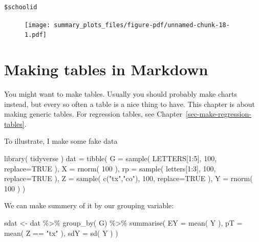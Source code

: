\documentclass[
  letterpaper,
  DIV=11,
  numbers=noendperiod]{scrreprt}
\newenvironment{Shaded}{\begin{snugshade}}{\end{snugshade}}
\newcommand{\AttributeTok}[1]{\textcolor[rgb]{0.49,0.56,0.16}{#1}}
\newcommand{\ConstantTok}[1]{\textcolor[rgb]{0.53,0.00,0.00}{#1}}
\newcommand{\DecValTok}[1]{\textcolor[rgb]{0.25,0.63,0.44}{#1}}
\newcommand{\FunctionTok}[1]{\textcolor[rgb]{0.02,0.16,0.49}{#1}}
\newcommand{\NormalTok}[1]{\textcolor[rgb]{0.00,0.44,0.13}{#1}}
\newcommand{\OtherTok}[1]{\textcolor[rgb]{0.00,0.44,0.13}{#1}}
\newcommand{\SpecialCharTok}[1]{\textcolor[rgb]{0.25,0.44,0.63}{#1}}
\newcommand{\StringTok}[1]{\textcolor[rgb]{0.25,0.44,0.63}{#1}}
\begin{document}
\begin{verbatim}
$schoolid
\end{verbatim}

\begin{figure}[H]

{\centering \texttt{[image: summary\_plots\_files/figure-pdf/unnamed-chunk-18-1.pdf]}

}

\end{figure}

\hypertarget{sec-make-tables}{%
\chapter{Making tables in Markdown}\label{sec-make-tables}}

You might want to make tables. Usually you should probably make charts
instead, but every so often a table is a nice thing to have. This
chapter is about making generic tables. For regression tables, see
Chapter~\ref{sec-make-regression-tables}.

To illustrate, I make some fake data

\begin{Shaded}
\begin{Highlighting}[]
\FunctionTok{library}\NormalTok{( tidyverse )}
\NormalTok{dat }\OtherTok{=} \FunctionTok{tibble}\NormalTok{( }\AttributeTok{G =} \FunctionTok{sample}\NormalTok{( LETTERS[}\DecValTok{1}\SpecialCharTok{:}\DecValTok{5}\NormalTok{], }\DecValTok{100}\NormalTok{, }\AttributeTok{replace=}\ConstantTok{TRUE}\NormalTok{ ),}
              \AttributeTok{X =} \FunctionTok{rnorm}\NormalTok{( }\DecValTok{100}\NormalTok{ ),}
              \AttributeTok{rp =} \FunctionTok{sample}\NormalTok{( letters[}\DecValTok{1}\SpecialCharTok{:}\DecValTok{3}\NormalTok{], }\DecValTok{100}\NormalTok{, }\AttributeTok{replace=}\ConstantTok{TRUE}\NormalTok{ ),}
              \AttributeTok{Z =} \FunctionTok{sample}\NormalTok{( }\FunctionTok{c}\NormalTok{(}\StringTok{"tx"}\NormalTok{,}\StringTok{"co"}\NormalTok{), }\DecValTok{100}\NormalTok{, }\AttributeTok{replace=}\ConstantTok{TRUE}\NormalTok{ ),}
              \AttributeTok{Y =} \FunctionTok{rnorm}\NormalTok{( }\DecValTok{100}\NormalTok{ ) )}
\end{Highlighting}
\end{Shaded}

We can make summery of it by our grouping variable:

\begin{Shaded}
\begin{Highlighting}[]
\NormalTok{sdat }\OtherTok{\textless{}{-}}\NormalTok{ dat }\SpecialCharTok{\%\textgreater{}\%} \FunctionTok{group\_by}\NormalTok{( G) }\SpecialCharTok{\%\textgreater{}\%}
    \FunctionTok{summarise}\NormalTok{( }\AttributeTok{EY =} \FunctionTok{mean}\NormalTok{( Y ),}
               \AttributeTok{pT =} \FunctionTok{mean}\NormalTok{( Z }\SpecialCharTok{==} \StringTok{"tx"}\NormalTok{ ),}
               \AttributeTok{sdY =} \FunctionTok{sd}\NormalTok{( Y ) )}
\end{Highlighting}
\end{Shaded}
\end{document}
